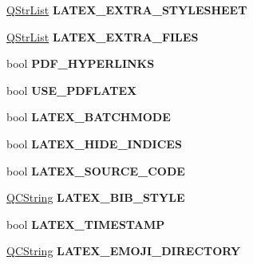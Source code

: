 \begin{DoxyCompactItemize}
\item 
\mbox{\label{class_config_values_af15e95a35b515260c62701a7199f0549}} 
\mbox{\hyperlink{class_q_str_list}{Q\+Str\+List}} {\bfseries L\+A\+T\+E\+X\+\_\+\+E\+X\+T\+R\+A\+\_\+\+S\+T\+Y\+L\+E\+S\+H\+E\+ET}
\item 
\mbox{\label{class_config_values_ac9f511e98c2497824f2910b9528bb1b4}} 
\mbox{\hyperlink{class_q_str_list}{Q\+Str\+List}} {\bfseries L\+A\+T\+E\+X\+\_\+\+E\+X\+T\+R\+A\+\_\+\+F\+I\+L\+ES}
\item 
\mbox{\label{class_config_values_a001ccc6d00b65f3f4096e1eab04d8761}} 
bool {\bfseries P\+D\+F\+\_\+\+H\+Y\+P\+E\+R\+L\+I\+N\+KS}
\item 
\mbox{\label{class_config_values_a40a986427e67c0e5d49f29c3e6ffe478}} 
bool {\bfseries U\+S\+E\+\_\+\+P\+D\+F\+L\+A\+T\+EX}
\item 
\mbox{\label{class_config_values_a9f05b9de9fe385a805999bd2dbddd1ec}} 
bool {\bfseries L\+A\+T\+E\+X\+\_\+\+B\+A\+T\+C\+H\+M\+O\+DE}
\item 
\mbox{\label{class_config_values_ae9d41efcb2ddf1591e2e38214d46d025}} 
bool {\bfseries L\+A\+T\+E\+X\+\_\+\+H\+I\+D\+E\+\_\+\+I\+N\+D\+I\+C\+ES}
\item 
\mbox{\label{class_config_values_ab8151a52fe6e9f1ae679cfc078c19bf0}} 
bool {\bfseries L\+A\+T\+E\+X\+\_\+\+S\+O\+U\+R\+C\+E\+\_\+\+C\+O\+DE}
\item 
\mbox{\label{class_config_values_ae2550a544e4bb419ec1c742abcf48062}} 
\mbox{\hyperlink{class_q_c_string}{Q\+C\+String}} {\bfseries L\+A\+T\+E\+X\+\_\+\+B\+I\+B\+\_\+\+S\+T\+Y\+LE}
\item 
\mbox{\label{class_config_values_a87c15989080ca0dfcd3cc14bfca13fac}} 
bool {\bfseries L\+A\+T\+E\+X\+\_\+\+T\+I\+M\+E\+S\+T\+A\+MP}
\item 
\mbox{\label{class_config_values_ad1d68cec771c9be6720503371ec84098}} 
\mbox{\hyperlink{class_q_c_string}{Q\+C\+String}} {\bfseries L\+A\+T\+E\+X\+\_\+\+E\+M\+O\+J\+I\+\_\+\+D\+I\+R\+E\+C\+T\+O\+RY}

\end{DoxyCompactItemize}
